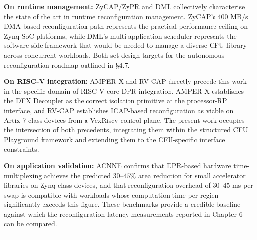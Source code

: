 \textbf{On runtime management:} ZyCAP/ZyPR and DML collectively characterise the state of the art in runtime reconfiguration management. ZyCAP's 400 MB/s DMA-based reconfiguration path represents the practical performance ceiling on Zynq SoC platforms, while DML's multi-application scheduler represents the software-side framework that would be needed to manage a diverse CFU library across concurrent workloads. Both set design targets for the autonomous reconfiguration roadmap outlined in §4.7.

\textbf{On RISC-V integration:} AMPER-X and RV-CAP directly precede this work in the specific domain of RISC-V core DPR integration. AMPER-X establishes the DFX Decoupler as the correct isolation primitive at the processor-RP interface, and RV-CAP establishes ICAP-based reconfiguration as viable on Artix-7 class devices from a VexRiscv control plane. The present work occupies the intersection of both precedents, integrating them within the structured CFU Playground framework and extending them to the CFU-specific interface constraints.

\textbf{On application validation:} ACNNE confirms that DPR-based hardware time-multiplexing achieves the predicted 30–45\% area reduction for small accelerator libraries on Zynq-class devices, and that reconfiguration overhead of 30–45 ms per swap is compatible with workloads whose computation time per region significantly exceeds this figure. These benchmarks provide a credible baseline against which the reconfiguration latency measurements reported in Chapter 6 can be compared.

\vspace{0.4em}\hrule\vspace{0.4em}
